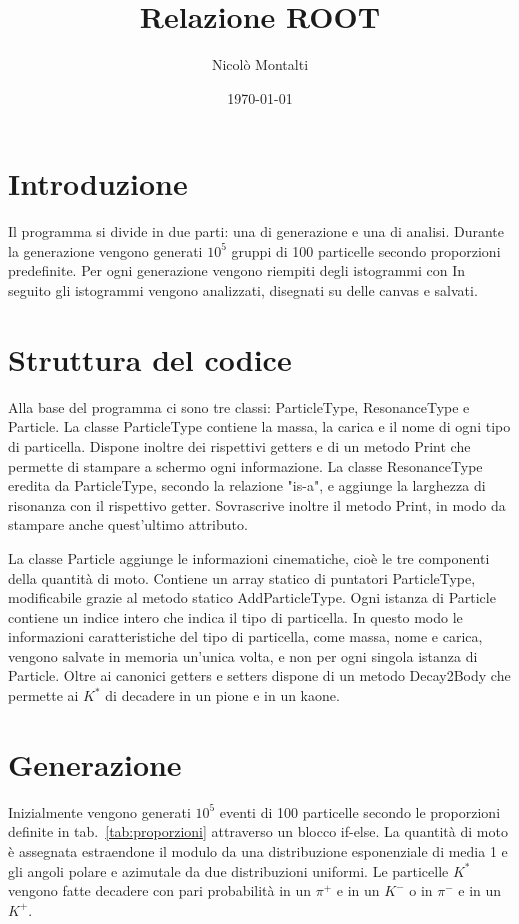 \documentclass[a4paper,10pt,twocolumn]{article}
\title{Relazione ROOT}
\author{Nicolò Montalti}
\date{\today}
\begin{document}
\maketitle
\section{Introduzione}
Il programma si divide in due parti: una di generazione e una di analisi. Durante la generazione vengono generati $10^5$ gruppi di 100 particelle secondo proporzioni predefinite. Per ogni generazione vengono riempiti degli istogrammi con
In seguito gli istogrammi vengono analizzati, disegnati su delle canvas e salvati.

\section{Struttura del codice}
Alla base del programma ci sono tre classi: ParticleType, ResonanceType e Particle. La classe ParticleType contiene la massa, la carica e il nome di ogni tipo di particella. Dispone inoltre dei rispettivi getters e di un metodo Print che permette di stampare a schermo ogni informazione. La classe ResonanceType eredita da ParticleType, secondo la relazione "is-a", e aggiunge la larghezza di risonanza con il rispettivo getter. Sovrascrive inoltre il metodo Print, in modo da stampare anche quest'ultimo attributo.

La classe Particle aggiunge le informazioni cinematiche, cioè le tre componenti della quantità di moto. Contiene un array statico di puntatori ParticleType, modificabile grazie al metodo statico AddParticleType. Ogni istanza di Particle contiene un indice intero che indica il tipo di particella. In questo modo le informazioni caratteristiche del tipo di particella, come massa, nome e carica, vengono salvate in memoria un'unica volta, e non per ogni singola istanza di Particle. Oltre ai canonici getters e setters dispone di un metodo Decay2Body che permette ai $K^*$ di decadere in un pione e in un kaone.

\section{Generazione}
Inizialmente vengono generati $10^5$ eventi di 100 particelle secondo le proporzioni definite in tab.~\ref{tab:proporzioni} attraverso un blocco if-else. La quantità di moto è assegnata estraendone il modulo da una distribuzione esponenziale di media 1 e gli angoli polare e azimutale da due distribuzioni uniformi. Le particelle $K^*$ vengono fatte decadere con pari probabilità in un $\pi^+$ e in un $K^-$ o in $\pi^-$ e in un $K^+$.
\end{document}
